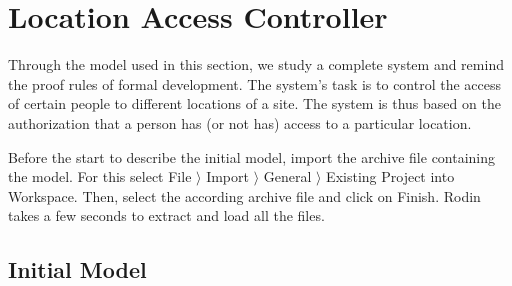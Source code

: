 \section{Location Access Controller}
\label{tutorial_10}



Through the model used in this section, we study a complete system and remind the proof rules of formal development. The system's task is to control the access of certain people to different locations of a site. The system is thus based on the authorization that a person has (or not has) access to a particular location.

Before the start to describe the initial model, import the archive file  containing the model. For this select  \textsf{File $\rangle$ Import $\rangle$ General $\rangle$ Existing Project into Workspace}. Then, select the according archive file and click on \textsf{Finish}. Rodin takes a few seconds to extract and load all the files.

\subsection{Initial Model} \label{tut_10_initial_model}


 

